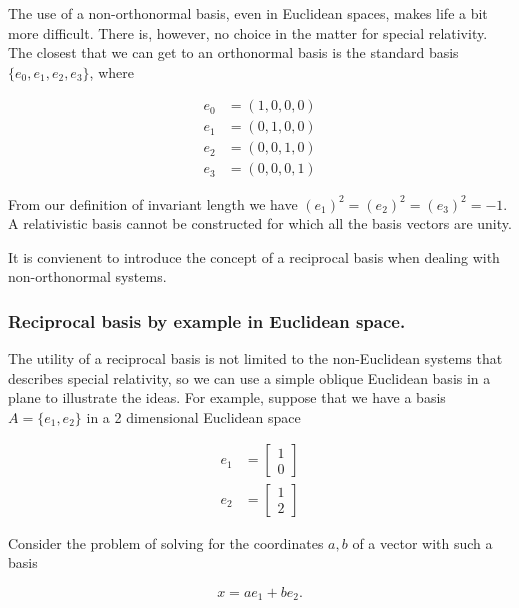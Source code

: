 The use of a non-orthonormal basis, even in Euclidean spaces, makes life a bit more difficult.  There is, however, no choice in the matter for special relativity.  The closest that we can get to an orthonormal basis is the standard basis $\{e_0, e_1, e_2, e_3\}$, where

\begin{equation}\label{eqn:grahamSchmidtLorentz:70}
\begin{aligned}
e_0 &= (1, 0, 0, 0) \\
e_1 &= (0, 1, 0, 0) \\
e_2 &= (0, 0, 1, 0) \\
e_3 &= (0, 0, 0, 1) 
\end{aligned}
\end{equation}

From our definition of invariant length we have $(e_1)^2 = (e_2)^2 = (e_3)^2 = -1$.  A relativistic basis cannot be constructed for which all the basis vectors are unity.

It is convienent to introduce the concept of a reciprocal basis when dealing with non-orthonormal systems.

\subsubsection{Reciprocal basis by example in Euclidean space.}

The utility of a reciprocal basis is not limited to the non-Euclidean systems that describes special relativity, so we can use a simple oblique Euclidean basis in a plane to illustrate the ideas.  For example, suppose that we have a basis $A = \{e_1, e_2\}$ in a 2 dimensional Euclidean space

\begin{equation}\label{eqn:grahamSchmidtLorentz:90}
\begin{aligned}
e_1 &= 
\begin{bmatrix}
1 \\
0
\end{bmatrix} \\
e_2 &= 
\begin{bmatrix}
1 \\
2
\end{bmatrix} 
\end{aligned}
\end{equation}

Consider the problem of solving for the coordinates $a,b$ of a vector with such a basis

\begin{equation}\label{eqn:grahamSchmidtLorentz:110}
x = a e_1 + b e_2.
\end{equation}


